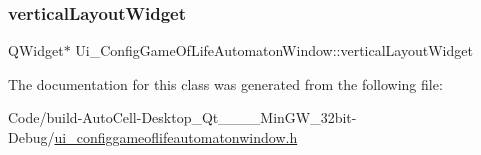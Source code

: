 \mbox{\label{class_ui___config_game_of_life_automaton_window_a230759c7492f71053f13caaffad25c46}} 
\subsubsection{\texorpdfstring{vertical\+Layout\+Widget}{verticalLayoutWidget}}
{\footnotesize\ttfamily Q\+Widget$\ast$ Ui\+\_\+\+Config\+Game\+Of\+Life\+Automaton\+Window\+::vertical\+Layout\+Widget}



The documentation for this class was generated from the following file\+:\begin{DoxyCompactItemize}
\item 
Code/build-\/\+Auto\+Cell-\/\+Desktop\+\_\+\+Qt\+\_\+\_\+\_\+\_\+\+Min\+G\+W\+\_\+32bit-\/\+Debug/\mbox{\hyperlink{ui__configgameoflifeautomatonwindow_8h}{ui\+\_\+configgameoflifeautomatonwindow.\+h}}\end{DoxyCompactItemize}
